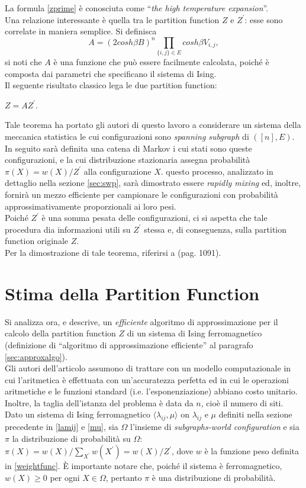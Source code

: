 La formula \ref{zprime} è conosciuta come ``\textit{the high temperature expansion}''.\\
Una relazione interessante è quella tra le partition function $Z$ e $Z^\prime$: esse sono correlate in maniera semplice. Si definisca
\begin{equation}
	A = (2cosh\beta B)^{n} \prod_{\{i,j\}\in E}{cosh\beta V_{i,j}},
	\label{funca}
\end{equation}
si noti che $A$ è una funzione che può essere facilmente calcolata, poiché è composta dai parametri che specificano il sistema di Ising.\\
Il seguente risultato classico \cite{newell1953theory} lega le due partition function:
\begin{thm}
	$Z = AZ^\prime$.
	\label{thm:zaz}
\end{thm}
Tale teorema ha portato gli autori di questo lavoro a considerare un sistema della meccanica statistica le cui configurazioni sono \textit{spanning subgraph} di $([n], E)$. In seguito sarà definita una catena di Markov i cui stati sono queste configurazioni, e la cui distribuzione stazionaria assegna probabilità $\pi(X) = w(X)/Z^\prime$ alla configurazione $X$. questo processo, analizzato in dettaglio nella sezione \ref{sec:swp}, sarà dimostrato essere \textit{rapidly mixing} ed, inoltre, fornirà un mezzo efficiente per campionare le configurazioni con probabilità approssimativamente proporzionali ai loro pesi.\\
Poiché $Z^\prime$ è una somma pesata delle configurazioni, ci si aspetta che tale procedura dia informazioni utili su $Z^\prime$ stessa e, di conseguenza, sulla partition function originale $Z$.\\
Per la dimostrazione di tale teorema, riferirsi a \cite{jerrum1993polynomial} (pag. 1091).
\section{Stima della Partition Function}
Si analizza ora, e descrive, un \textit{efficiente} algoritmo di approssimazione per il calcolo della partition function $Z$ di un sistema di Ising ferromagnetico (definizione di ``algoritmo di approssimazione efficiente'' al paragrafo \ref{sec:approxalgo}).\\
Gli autori dell'articolo assumono di trattare con un modello computazionale in cui l'aritmetica è effettuata con un'accuratezza perfetta ed in cui le operazioni aritmetiche e le funzioni standard (i.e. l'esponenziazione) abbiano costo unitario. Inoltre, la taglia dell'istanza del problema è data da $n$, cioè il numero di siti.\\
Dato un sistema di Ising ferromagnetico $\langle\lambda_{ij}, \mu\rangle$  on $\lambda_{ij}$ e $\mu$ definiti nella sezione precedente in \ref{lamij} e \ref{mu}, sia $\Omega$ l'insieme di \textit{subgraphs-world configuration} e sia $\pi$ la distribuzione di probabilità su $\Omega$: $\pi(X) = w(X)/\sum_{X^{\prime}}{w(X^{\prime})} = w(X)/Z^{\prime}$, dove $w$ è la funzione peso definita in \ref{weightfunc}.
È importante notare che, poiché il sistema è ferromagnetico, $w(X) \geq 0$ per ogni $X \in \Omega$, pertanto $\pi$ è una distribuzione di probabilità.
